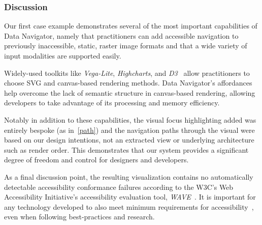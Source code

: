 \documentclass[journal]{vgtc}                %
\begin{document}
\subsubsection{Discussion}
Our first case example demonstrates several of the most important capabilities of Data Navigator, namely that practitioners can add accessible navigation to previously inaccessible, static, raster image formats and that a wide variety of input modalities are supported easily.

Widely-used toolkits like \textit{Vega-Lite}, \textit{Highcharts}, and \textit{D3}~\cite{Bostock2011D3} allow practitioners to choose SVG and canvas-based rendering methods. Data Navigator's affordances help overcome the lack of semantic structure in canvas-based rendering, allowing developers to take advantage of its processing and memory efficiency.

Notably in addition to these capabilities, the visual focus highlighting added was entirely bespoke (as in~\autoref{path}) and the navigation paths through the visual were based on our design intentions, not an extracted view or underlying architecture such as render order. This demonstrates that our system provides a significant degree of freedom and control for designers and developers.

As a final discussion point, the resulting visualization contains no automatically detectable accessibility conformance failures according to the W3C's Web Accessibility Initiative's accessibility evaluation tool, \textit{WAVE}~\cite{WebAIMWAVE}. It is important for any technology developed to also meet minimum requirements for accessibility~\cite{Lundgard2019Sociotechnical,Lundgard2022Accessible,Zong2022Rich,Elavsky2022Chartability}, even when following best-practices and research.
\end{document}
